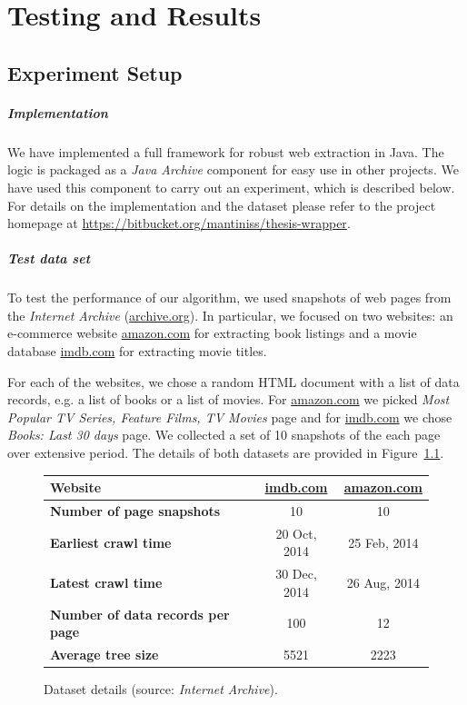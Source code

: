 \chapter{Testing and Results}


\section{Experiment Setup}

\paragraph{Implementation} We have implemented a full framework for robust web extraction in Java. The logic is packaged as a \emph{Java Archive} component for easy use in other projects. We have used this component to carry out an experiment, which is described below. For details on the implementation and the dataset please refer to the project homepage at \url{https://bitbucket.org/mantiniss/thesis-wrapper}.

\paragraph{Test data set} To test the performance of our algorithm, we used snapshots of web pages from the \emph{Internet Archive} (\url{archive.org}). In particular, we focused on two websites: an e-commerce website \url{amazon.com} for extracting book listings and a movie database \url{imdb.com} for extracting movie titles.

For each of the websites, we chose a random HTML document with a list of data records, e.g. a list of books or a list of movies. For \url{amazon.com} we picked \emph{Most Popular TV Series, Feature Films, TV Movies} page and for \url{imdb.com} we chose \emph{Books: Last 30 days} page. We collected a set of 10 snapshots of the each page over extensive period. The details of both datasets are provided in Figure~\ref{tbl:dataset}.

\begin{figure}[h]
	\centering
    \begin{tabularx}{\textwidth}{ | X | c | c | }
		\hline
		\textbf{Website} & \url{imdb.com} & \url{amazon.com} \\
		\hline
		\textbf{Number of page snapshots} & 10 & 10 \\
		\hline
		\textbf{Earliest crawl time} & 20 Oct, 2014 & 25 Feb, 2014 \\
		\hline
		\textbf{Latest crawl time} & 30 Dec, 2014 & 26 Aug, 2014 \\
		\hline
		\textbf{Number of data records per page} & 100 & 12 \\
		\hline
		\textbf{Average tree size} & 5521 & 2223 \\
		\hline
    \end{tabularx}
	\caption{Dataset details (source: \emph{Internet Archive}).}
	\label{tbl:dataset}
\end{figure}

